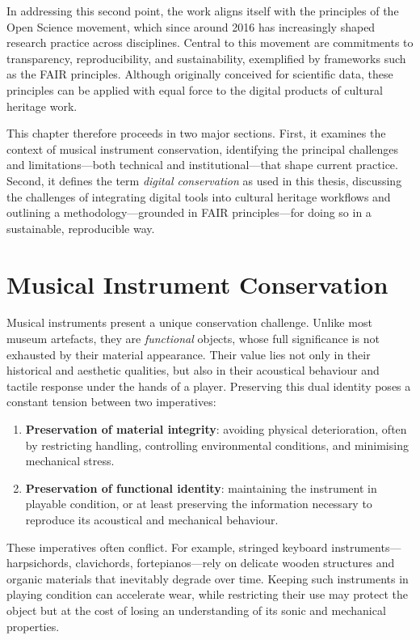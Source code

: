 In addressing this second point, the work aligns itself with the principles of the Open Science movement, which since around 2016 has increasingly shaped research practice across disciplines. Central to this movement are commitments to transparency, reproducibility, and sustainability, exemplified by frameworks such as the FAIR principles. Although originally conceived for scientific data, these principles can be applied with equal force to the digital products of cultural heritage work.

This chapter therefore proceeds in two major sections. First, it examines the context of musical instrument conservation, identifying the principal challenges and limitations—both technical and institutional—that shape current practice. Second, it defines the term \emph{digital conservation} as used in this thesis, discussing the challenges of integrating digital tools into cultural heritage workflows and outlining a methodology—grounded in FAIR principles—for doing so in a sustainable, reproducible way.

\section{Musical Instrument Conservation}

Musical instruments present a unique conservation challenge. Unlike most museum artefacts, they are \emph{functional} objects, whose full significance is not exhausted by their material appearance. Their value lies not only in their historical and aesthetic qualities, but also in their acoustical behaviour and tactile response under the hands of a player. Preserving this dual identity poses a constant tension between two imperatives:

\begin{enumerate}
    \item \textbf{Preservation of material integrity}: avoiding physical deterioration, often by restricting handling, controlling environmental conditions, and minimising mechanical stress.
    \item \textbf{Preservation of functional identity}: maintaining the instrument in playable condition, or at least preserving the information necessary to reproduce its acoustical and mechanical behaviour.
\end{enumerate}

These imperatives often conflict. For example, stringed keyboard instruments—harpsichords, clavichords, fortepianos—rely on delicate wooden structures and organic materials that inevitably degrade over time. Keeping such instruments in playing condition can accelerate wear, while restricting their use may protect the object but at the cost of losing an understanding of its sonic and mechanical properties.

